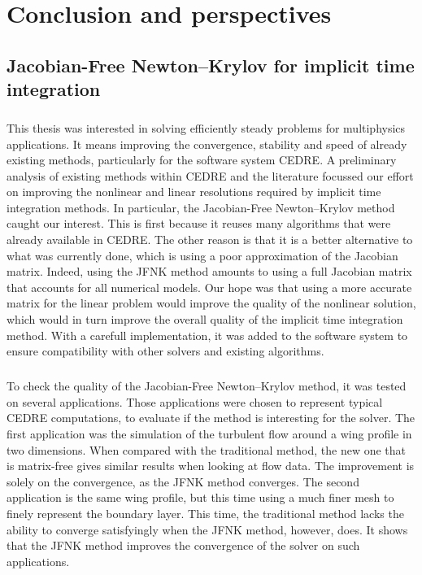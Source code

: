 \chapter*{Conclusion and perspectives}

  \section*{Jacobian-Free Newton--Krylov for implicit time integration}

    \paragraph{}
    This thesis was interested in solving efficiently steady problems for multiphysics applications.
    It means improving the convergence, stability and speed of already existing methods, particularly for the software system CEDRE.
    A preliminary analysis of existing methods within CEDRE and the literature focussed our effort on improving the nonlinear and linear resolutions required by implicit time integration methods.
    In particular, the Jacobian-Free Newton--Krylov method caught our interest.
    This is first because it reuses many algorithms that were already available in CEDRE.
    The other reason is that it is a better alternative to what was currently done, which is using a poor approximation of the Jacobian matrix.
    Indeed, using the JFNK method amounts to using a full Jacobian matrix that accounts for all numerical models.
    Our hope was that using a more accurate matrix for the linear problem would improve the quality of the nonlinear solution, which would in turn improve the overall quality of the implicit time integration method.
    With a carefull implementation, it was added to the software system to ensure compatibility with other solvers and existing algorithms.

    \paragraph{}
    To check the quality of the Jacobian-Free Newton--Krylov method, it was tested on several applications.
    Those applications were chosen to represent typical CEDRE computations, to evaluate if the method is interesting for the solver.
    The first application was the simulation of the turbulent flow around a wing profile in two dimensions.
    When compared with the traditional method, the new one that is matrix-free gives similar results when looking at flow data.
    The improvement is solely on the convergence, as the JFNK method converges.
    The second application is the same wing profile, but this time using a much finer mesh to finely represent the boundary layer.
    This time, the traditional method lacks the ability to converge satisfyingly when the JFNK method, however, does.
    It shows that the JFNK method improves the convergence of the solver on such applications.

